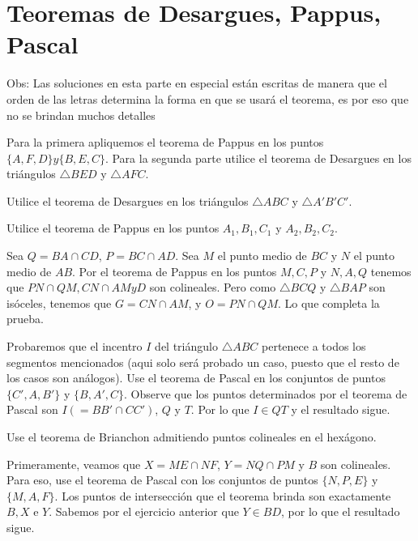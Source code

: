 \section{Teoremas de Desargues, Pappus, Pascal}

Obs: Las soluciones en esta parte en especial est\'an escritas de manera que el orden de las letras determina la forma en que se usar\'a el teorema, es por eso que no se brindan muchos detalles
\begin{sol}
	Para la primera apliquemos el teorema de Pappus en los puntos $\{A, F, D\} y \{B, E, C\}$. Para la segunda parte utilice el teorema de Desargues en los tri\'angulos $\triangle BED$ y $\triangle AFC$.
\end{sol}

\begin{sol}
	Utilice el teorema de Desargues en los tri\'angulos $\triangle ABC$ y $\triangle A'B'C'$. 
\end{sol}

\begin{sol}
	Utilice el teorema de Pappus en los puntos $A_{1}, B_{1}, C_{1}$ y $A_{2}, B_{2}, C_{2}$. 
\end{sol}

\begin{sol}
	Sea $Q =BA \cap CD$, $P = BC \cap AD$. Sea $M$ el punto medio de $BC$ y $N$ el punto medio de $AB$. Por el teorema de Pappus en los puntos $M, C, P $ y $N, A, Q$ tenemos que $PN\cap QM, CN \cap AM y D$ son colineales. Pero como $\triangle BCQ$ y $\triangle BAP$ son is\'oceles, tenemos que $G = CN \cap AM$, y $ O = PN \cap QM$. Lo que completa la prueba.
\end{sol}

\begin{sol}
	Probaremos que el incentro $I$ del tri\'angulo $\triangle ABC$ pertenece a todos los segmentos mencionados (aqui solo ser\'a probado un caso, puesto que el resto de los casos son an\'alogos). Use el teorema de Pascal en los conjuntos de puntos $\{C', A, B'\}$ y $\{B, A', C\}$. Observe que los puntos determinados por el teorema de Pascal son $I (= BB' \cap CC')$, $Q$ y $T$. Por lo que $I\in QT$ y el resultado sigue.
\end{sol}

\begin{sol}
	Use el teorema de Brianchon admitiendo puntos colineales en el hex\'agono.
\end{sol}


\begin{sol}
	Primeramente, veamos que $X = ME\cap NF$, $Y = NQ \cap PM$ y $B$ son colineales. Para eso, use el teorema de Pascal con los conjuntos de puntos $\{N, P, E\}$ y $\{M, A, F\}$. Los puntos de intersecci\'on que el teorema brinda son exactamente $B, X$ e $Y$. Sabemos por el ejercicio anterior que $Y\in BD$, por lo que el resultado sigue.
\end{sol}

